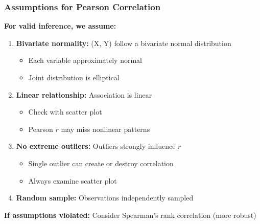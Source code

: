 \documentclass{beamer}
\begin{document}
\begin{frame}
\frametitle{Assumptions for Pearson Correlation}
\textbf{For valid inference, we assume:}

\begin{enumerate}
\item \textbf{Bivariate normality:} (X, Y) follow a bivariate normal distribution
  \begin{itemize}
  \item Each variable approximately normal
  \item Joint distribution is elliptical
  \end{itemize}

\item \textbf{Linear relationship:} Association is linear
  \begin{itemize}
  \item Check with scatter plot
  \item Pearson $r$ may miss nonlinear patterns
  \end{itemize}

\item \textbf{No extreme outliers:} Outliers strongly influence $r$
  \begin{itemize}
  \item Single outlier can create or destroy correlation
  \item Always examine scatter plot
  \end{itemize}

\item \textbf{Random sample:} Observations independently sampled
\end{enumerate}

\vspace{0.3cm}
\textbf{If assumptions violated:} Consider Spearman's rank correlation (more robust)
\end{frame}
\end{document}
